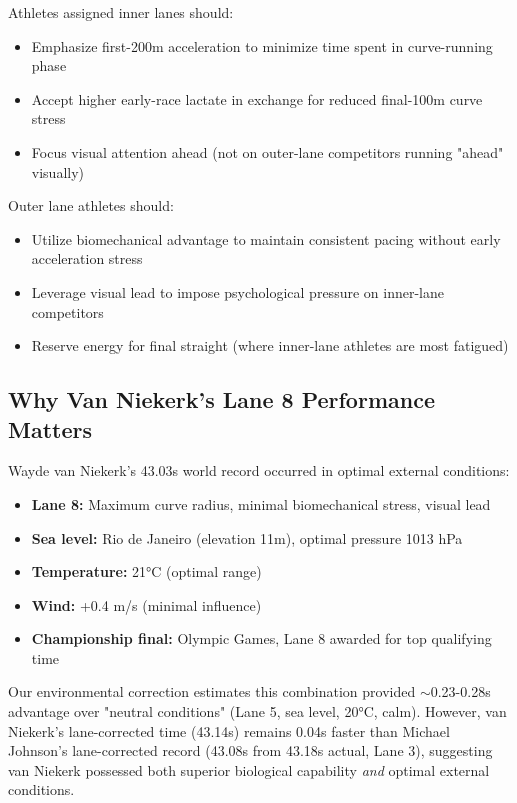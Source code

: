 \documentclass[12pt]{article}
\begin{document}
Athletes assigned inner lanes should:
\begin{itemize}
    \item Emphasize first-200m acceleration to minimize time spent in curve-running phase
    \item Accept higher early-race lactate in exchange for reduced final-100m curve stress
    \item Focus visual attention ahead (not on outer-lane competitors running "ahead" visually)
\end{itemize}

Outer lane athletes should:
\begin{itemize}
    \item Utilize biomechanical advantage to maintain consistent pacing without early acceleration stress
    \item Leverage visual lead to impose psychological pressure on inner-lane competitors
    \item Reserve energy for final straight (where inner-lane athletes are most fatigued)
\end{itemize}

\subsection{Why Van Niekerk's Lane 8 Performance Matters}

Wayde van Niekerk's 43.03s world record occurred in optimal external conditions:
\begin{itemize}
    \item \textbf{Lane 8:} Maximum curve radius, minimal biomechanical stress, visual lead
    \item \textbf{Sea level:} Rio de Janeiro (elevation 11m), optimal pressure 1013 hPa
    \item \textbf{Temperature:} 21°C (optimal range)
    \item \textbf{Wind:} +0.4 m/s (minimal influence)
    \item \textbf{Championship final:} Olympic Games, Lane 8 awarded for top qualifying time
\end{itemize}

Our environmental correction estimates this combination provided $\sim$0.23-0.28s advantage over "neutral conditions" (Lane 5, sea level, 20°C, calm). However, van Niekerk's lane-corrected time (43.14s) remains 0.04s faster than Michael Johnson's lane-corrected record (43.08s from 43.18s actual, Lane 3), suggesting van Niekerk possessed both superior biological capability \textit{and} optimal external conditions.
\end{document}
